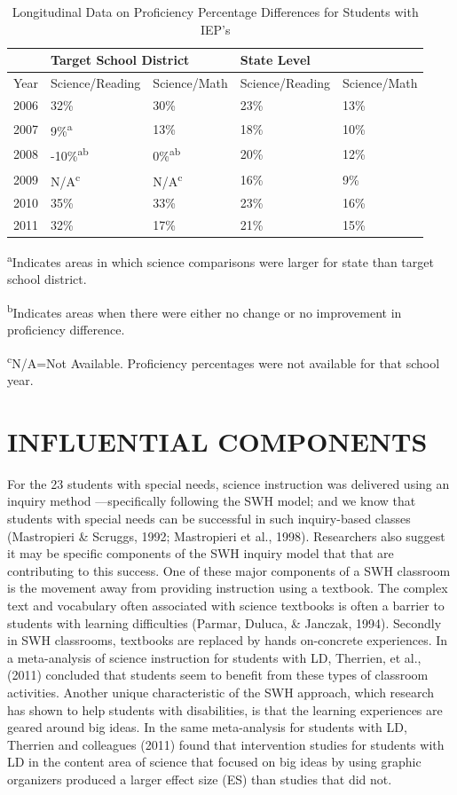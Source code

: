 \documentclass[11.5pt]{sig-alternate} %
\begin{document}
\begin{large}
\begin{table}[tph]
\caption{Longitudinal Data on Proficiency Percentage Differences for Students with IEP’s}
\begin{tabular}{lllll}
\hline
 & \multicolumn{2}{l}{Target School District} & \multicolumn{2}{l}{State Level} \\ \hline
Year & Science/Reading & Science/Math & Science/Reading & Science/Math \\ \hline
2006 & 32\% & 30\% & 23\% & 13\% \\
2007 & 9\%\textsuperscript{a} & 13\% & 18\% & 10\% \\
2008 & -10\%\textsuperscript{ab} & 0\%\textsuperscript{ab} & 20\% & 12\% \\
2009 & N/A\textsuperscript{c} & N/A\textsuperscript{c} & 16\% & 9\% \\
2010 & 35\% & 33\% & 23\% & 16\% \\
2011 & 32\% & 17\% & 21\% & 15\% \\ \hline
\end{tabular}
\textsuperscript{a}Indicates areas in which science comparisons were larger for state than target school district.

\textsuperscript{b}Indicates areas when there were either no change or no improvement in proficiency difference.

\textsuperscript{c}N/A=Not Available. Proficiency percentages were not available for that school year.

\end{table}

\section*{INFLUENTIAL COMPONENTS}
For the 23 students with special needs, science instruction was delivered using an inquiry method —specifically following the SWH model; and we know that students with special needs can be successful in such inquiry-based classes (Mastropieri \& Scruggs, 1992; Mastropieri et al., 1998). Researchers also suggest it may be specific components of the SWH inquiry model that that are contributing to this success. One of these major components of a SWH classroom is the movement away from providing instruction using a textbook. The complex text and vocabulary often associated with science textbooks is often a barrier to students with learning difficulties (Parmar, Duluca, \& Janczak, 1994). Secondly in SWH classrooms, textbooks are replaced by hands on-concrete experiences. In a meta-analysis of science instruction for students with LD, Therrien, et al., (2011) concluded that students seem to benefit from these types of classroom activities. Another unique characteristic of the SWH approach, which research has shown to help students with disabilities, is that the learning experiences are geared around big ideas. In the same meta-analysis for students with LD, Therrien and colleagues (2011) found that intervention studies for students with LD in the content area of science that focused on big ideas by using graphic organizers produced a larger effect size (ES) than studies that did not.


\end{large}
\end{document}
